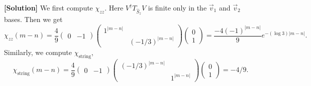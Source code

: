 \documentclass[11pt,a4paper,oneside]{article}
\begin{document}
\begin{enumerate}[(a)]
\textbf{[Solution]}
We first compute $\chi_{zz}$.
Here $V^\dagger T_{\hat{S}_z} V$ is finite only in the $\vec{v}_1$ and $\vec{v}_2$ bases.
Then we get
\begin{equation}
\chi_{zz} (m - n) = \frac{4}{9}
\begin{pmatrix}
0 & -1
\end{pmatrix}
\begin{pmatrix}
1^{|m-n|} & \\
& (-1/3)^{|m-n|} 
\end{pmatrix}
\begin{pmatrix}
0 \\ 1
\end{pmatrix}
= \frac{-4 (-1)^{|m-n|} }{9} e^{- (\log 3) | m - n|}.
\end{equation}
Similarly, we compute $\chi_\mathrm{string}$,
\begin{equation}
\chi_\mathrm{string} ( m-n) = 
\frac{4}{9}
\begin{pmatrix}
0 & -1
\end{pmatrix}
\begin{pmatrix}
(-1/3)^{|m-n|}  & \\
& 1^{|m-n|}
\end{pmatrix}
\begin{pmatrix}
0 \\ 1
\end{pmatrix}
= -4/9.
\end{equation}

\end{enumerate}
\end{document}
